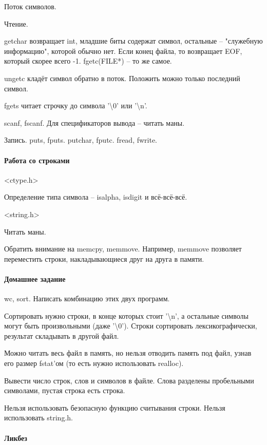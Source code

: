 \documentclass[a4paper,10pt]{article}
\begin{document}
Поток символов.

Чтение. 

getchar возвращает int, младшие биты содержат символ, остальные -- "служебную информацию", которой обычно нет. Если конец файла, то возвращает EOF, который скорее всего -1. fgetc(FILE*) -- то же самое.

ungetc кладёт символ обратно в поток. Положить можно только последний символ.

fgets читает строчку до символа '\textbackslash{}0' или '\textbackslash{}n'. 

scanf, fscanf. Для спецификаторов вывода -- читать маны.

Запись.
puts, fputs.
putchar, fputc.
fread, fwrite.

\paragraph{Работа со строками}

<ctype.h>

Определение типа символа -- isalpha, isdigit и всё-всё-всё.

<string.h>

Читать маны. 

Обратить внимание на memcpy, memmove. Например, memmove позволяет переместить строки, накладывающиеся друг на друга в памяти.

\paragraph{Домашнее задание}

wc, sort. Написать комбинацию этих двух программ.

Сортировать нужно строки, в конце которых стоит '\textbackslash{}n', а остальные символы могут быть произвольными (даже '\textbackslash{}0'). Строки сортировать лексикографически, результат складывать в другой файл.

Можно читать весь файл в память, но нельзя отводить память под файл, узнав его размер fstat'ом (то есть нужно использовать realloc).

Вывести число строк, слов и символов в файле. Слова разделены пробельными символами, пустая строка есть строка.

Нельзя использовать безопасную функцию считывания строки. Нельзя использовать string.h.

\paragraph{Ликбез}
\end{document}
